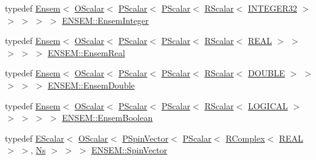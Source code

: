 \begin{DoxyCompactItemize}
\item 
typedef \mbox{\hyperlink{classENSEM_1_1Ensem}{Ensem}}$<$ \mbox{\hyperlink{classENSEM_1_1OScalar}{O\+Scalar}}$<$ \mbox{\hyperlink{classENSEM_1_1PScalar}{P\+Scalar}}$<$ \mbox{\hyperlink{classENSEM_1_1PScalar}{P\+Scalar}}$<$ \mbox{\hyperlink{classENSEM_1_1RScalar}{R\+Scalar}}$<$ \mbox{\hyperlink{namespaceENSEM_a6a58e5c07422c48c5d547184b36719bf}{I\+N\+T\+E\+G\+E\+R32}} $>$ $>$ $>$ $>$ $>$ \mbox{\hyperlink{group__defs_gab547eddfe397a7c79b9a4278ab384a2e}{E\+N\+S\+E\+M\+::\+Ensem\+Integer}}
\item 
typedef \mbox{\hyperlink{classENSEM_1_1Ensem}{Ensem}}$<$ \mbox{\hyperlink{classENSEM_1_1OScalar}{O\+Scalar}}$<$ \mbox{\hyperlink{classENSEM_1_1PScalar}{P\+Scalar}}$<$ \mbox{\hyperlink{classENSEM_1_1PScalar}{P\+Scalar}}$<$ \mbox{\hyperlink{classENSEM_1_1RScalar}{R\+Scalar}}$<$ \mbox{\hyperlink{namespaceENSEM_a6dd9aa6508168f545c861787e63ddd1e}{R\+E\+AL}} $>$ $>$ $>$ $>$ $>$ \mbox{\hyperlink{group__defs_ga358cdbc11379b9a4724ad42ae64374da}{E\+N\+S\+E\+M\+::\+Ensem\+Real}}
\item 
typedef \mbox{\hyperlink{classENSEM_1_1Ensem}{Ensem}}$<$ \mbox{\hyperlink{classENSEM_1_1OScalar}{O\+Scalar}}$<$ \mbox{\hyperlink{classENSEM_1_1PScalar}{P\+Scalar}}$<$ \mbox{\hyperlink{classENSEM_1_1PScalar}{P\+Scalar}}$<$ \mbox{\hyperlink{classENSEM_1_1RScalar}{R\+Scalar}}$<$ \mbox{\hyperlink{namespaceENSEM_adcbd0de4e9e0e7ef6aa9b681a554e2c5}{D\+O\+U\+B\+LE}} $>$ $>$ $>$ $>$ $>$ \mbox{\hyperlink{group__defs_gac42383c5825ab6504a44fe73b73027ad}{E\+N\+S\+E\+M\+::\+Ensem\+Double}}
\item 
typedef \mbox{\hyperlink{classENSEM_1_1Ensem}{Ensem}}$<$ \mbox{\hyperlink{classENSEM_1_1OScalar}{O\+Scalar}}$<$ \mbox{\hyperlink{classENSEM_1_1PScalar}{P\+Scalar}}$<$ \mbox{\hyperlink{classENSEM_1_1PScalar}{P\+Scalar}}$<$ \mbox{\hyperlink{classENSEM_1_1RScalar}{R\+Scalar}}$<$ \mbox{\hyperlink{namespaceENSEM_ade7c8d5976e979516f8c2ecd223dd0b6}{L\+O\+G\+I\+C\+AL}} $>$ $>$ $>$ $>$ $>$ \mbox{\hyperlink{group__defs_gac6945505f3ac714277458e0a944c15f0}{E\+N\+S\+E\+M\+::\+Ensem\+Boolean}}
\item 
typedef \mbox{\hyperlink{classENSEM_1_1EScalar}{E\+Scalar}}$<$ \mbox{\hyperlink{classENSEM_1_1OScalar}{O\+Scalar}}$<$ \mbox{\hyperlink{classENSEM_1_1PSpinVector}{P\+Spin\+Vector}}$<$ \mbox{\hyperlink{classENSEM_1_1PScalar}{P\+Scalar}}$<$ \mbox{\hyperlink{classENSEM_1_1RComplex}{R\+Complex}}$<$ \mbox{\hyperlink{namespaceENSEM_a6dd9aa6508168f545c861787e63ddd1e}{R\+E\+AL}} $>$ $>$, \mbox{\hyperlink{namespaceENSEM_a6f05e048f9b2eb1a19131074f8abc25f}{Ns}} $>$ $>$ $>$ \mbox{\hyperlink{group__defs_ga4cb5c4207c68050d0bd3e3e2d614bc78}{E\+N\+S\+E\+M\+::\+Spin\+Vector}}

\end{DoxyCompactItemize}
